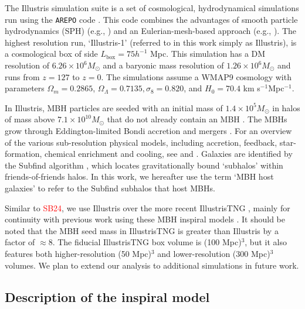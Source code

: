 \documentclass[twocolumn,linenumbers]{aastex701}
\newcommand{\kms}{km s$^{-1}$}
\newcommand{\SB}{\textcolor{red}{SB24}}
\begin{document}
The Illustris simulation suite is a set of cosmological, hydrodynamical simulations run using the {\tt AREPO}  code \citep{Springel_2010}. This code combines the advantages of smooth particle hydrodynamics (SPH) (e.g., \citet{Gingold1977, Lucy1997}) and an Eulerian-mesh-based approach (e.g., \citet{BERGER198964}). The highest resolution run, `Illustris-1' (referred to in this work simply as Illustris), is a cosmological box of side $L_{\text{box}} = 75 h^{-1}$ Mpc. This simulation has a DM resolution of $6.26 \times 10^6 M_{\odot}$ and a baryonic mass resolution of $1.26 \times 10^6 M_{\odot}$ and runs from $z=127$ to $z=0$. The simulations assume a WMAP9 cosmology \citep{Hinshaw_2013} with parameters $\Omega_m = 0.2865$, $\Omega_{\Lambda} = 0.7135, \sigma_{8} = 0.820$, and $H_{0} = 70.4$ \kms Mpc$^{-1}$.

In Illustris, MBH particles are seeded with an initial mass of $1.4 \times 10^5 M_{\odot}$ in halos of mass above $7.1 \times 10^{10} M_{\odot}$ that do not already contain an MBH \citep{Sijacki_2015}. The MBHs grow through Eddington-limited Bondi accretion and mergers \citep{Springel_2005, Di_Matteo_2005}. For an overview of the various sub-resolution physical models, including accretion, feedback, star-formation, chemical enrichment and cooling, see \citet{Vogelsberger_2013} and \citet{Torrey2014}. Galaxies are identified by the Subfind algorithm \cite{Dolag2009}, which locates gravitationally bound `subhalos' within friends-of-friends halos. In this work, we hereafter use the term `MBH host galaxies' to refer to the Subfind subhalos that host MBHs. 

Similar to \SB{}, we use Illustris over the more recent IllustrisTNG \citep{Nelson_2017,Springel_2017,Marinacci2018,Pillepich2018b,Naiman2018,Nelson2019,Pillepich2019}, mainly for continuity with previous work using these MBH inspiral models \citep{Kelley_2017a,sayeb_massive_2021}. It should be noted that the MBH seed mass in IllustrisTNG is greater than Illustris by a factor of $\approx 8$. The fiducial IllustrisTNG box volume is (100 Mpc)$^3$, but it also features both higher-resolution (50 Mpc)$^3$ and lower-resolution ($300$ Mpc)$^3$ volumes. We plan to extend our analysis to additional simulations in future work.

\subsection{Description of the inspiral model}

\label{sec: insp hardening}
\end{document}
